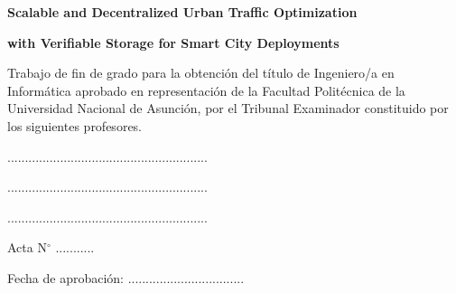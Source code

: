 \centerline{\textbf{\large Scalable and Decentralized Urban Traffic Optimization}}
\centerline{\textbf{\large with Verifiable Storage for Smart City Deployments}}

\vspace{0.5cm}

Trabajo de fin de grado para la obtención del título de Ingeniero/a en Informática
aprobado en representación de la Facultad Politécnica de la Universidad Nacional de
Asunción, por el Tribunal Examinador constituido por los siguientes profesores.

\vspace{2cm}

\centerline{.........................................................}

\vspace{2cm}

\centerline{.........................................................}

\vspace{2cm}

\centerline{.........................................................}

\vspace{2cm}


\vspace{2cm}


\vspace{2cm}

Acta N$^\circ$ ...........

\vspace{.5cm}

Fecha de aprobación: .................................

